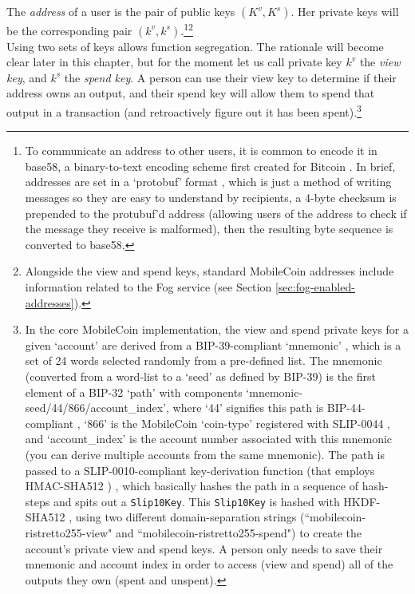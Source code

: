 The {\em address} of a user is the pair of public keys \((K^v, K^s)\). Her private keys will be the corresponding pair \( (k^v, k^s) \).\footnote{To communicate an address to other users, it is common to encode it in base58, a binary-to-text encoding scheme first created for Bitcoin \cite{base-58-encoding}. In brief, addresses are set in a `protobuf' format \cite{protubuf-encoding}, which is just a method of writing messages so they are easy to understand by recipients, a 4-byte checksum is prepended to the protubuf'd address (allowing users of the address to check if the message they receive is malformed), then the resulting byte sequence is converted to base58.}\footnote{Alongside the view and spend keys, standard MobileCoin addresses include information related to the Fog service (see Section \ref{sec:fog-enabled-addresses}).}
\\

Using two sets of keys allows function segregation. The rationale will become clear later in this chapter, but for the moment let us call private key $k^v$ the {\em view key}, and $k^s$ the {\em spend key}. A person can use their view key to determine if their address owns an output, and their spend key will allow them to spend that output in a transaction (and retroactively figure out it has been spent).\footnote{In the core MobileCoin implementation, the view and spend private keys for a given `account' are derived from a BIP-39-compliant `mnemonic' \cite{bip-39}, which is a set of 24 words selected randomly from a pre-defined list. The mnemonic (converted from a word-list to a `seed' \cite{tiny-bip39-lib} as defined by BIP-39) is the first element of a BIP-32 `path' \cite{bip-32} with components `mnemonic-seed/44/866/account\_index', where `44' signifies this path is BIP-44-compliant \cite{bip-44}, `866' is the MobileCoin `coin-type' registered with SLIP-0044 \cite{slip-44}, and `account\_index' is the account number associated with this mnemonic (you can derive multiple accounts from the same mnemonic). The path is passed to a SLIP-0010-compliant \cite{slip-10} key-derivation function (that employs HMAC-SHA512 \cite{hmac-rfc2104}) \cite{slip10-ed25519-lib}, which basically hashes the path in a sequence of hash-steps and spits out a {\tt Slip10Key}. This {\tt Slip10Key} is hashed with HKDF-SHA512 \cite{kdfs-rust-lib, hkdf-rfc5869}, using two different domain-separation strings (``mobilecoin-ristretto255-view" and ``mobilecoin-ristretto255-spend") to create the account's private view and spend keys. A person only needs to save their mnemonic and account index in order to access (view and spend) all of the outputs they own (spent and unspent).}



